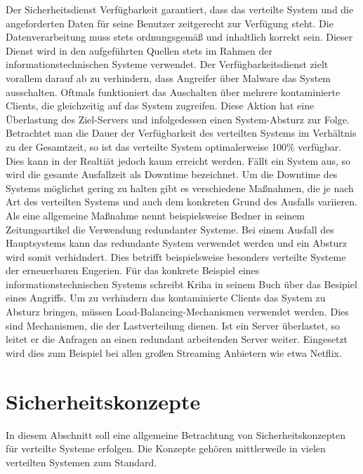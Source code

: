 \documentclass[utf8,biblatex]{lni}
\begin{document}
Der Sicherheitsdienst Verfügbarkeit garantiert, dass das verteilte System und die angeforderten Daten für seine Benutzer zeitgerecht zur Verfügung steht. Die Datenverarbeitung muss stets ordnungsgemäß
und inhaltlich korrekt sein. \citet{Bedner.2010}
Dieser Dienst wird in den aufgeführten Quellen stets im Rahmen der informationstechnischen Systeme verwendet. Der Verfügbarkeitsdienst
  zielt vorallem darauf ab zu verhindern, 
dass Angreifer über Malware das System ausschalten. Oftmals funktioniert das Auschalten über mehrere kontaminierte Clients, die gleichzeitig auf das System zugreifen. 
Diese Aktion hat eine Überlastung des Ziel-Servers und infolgedessen einen System-Absturz zur Folge. \citet{Kriha.2008}
\newline
Betrachtet man die Dauer der Verfügbarkeit des verteilten Systems im Verhältnis zu der Gesamtzeit, so ist das verteilte System optimalerweise 100\% verfügbar. Dies kann in der Realtiät jedoch kaum erreicht werden.
Fällt ein System aus, so wird die gesamte Ausfallzeit als Downtime bezeichnet. \citet{Bedner.2010}
\newline
 Um die Downtime des Systems möglichst gering zu halten gibt es verschiedene Maßnahmen, die je nach Art des verteilten Systems und auch
dem konkreten Grund des Ausfalls variieren. Als eine allgemeine Maßnahme nennt beispielsweise Bedner in seinem Zeitungsartikel \citet{Bedner.2010} die Verwendung redundanter Systeme. Bei einem Ausfall
des Hauptsystems kann das redundante System verwendet werden und ein Absturz wird somit verhidndert. Dies betrifft beispielsweise besonders verteilte Systeme der erneuerbaren Engerien.
Für das konkrete Beispiel eines informationstechnischen Systems schreibt Kriha in seinem Buch \citet{Kriha.2008} über das Besipiel eines Angriffs. Um zu verhindern das kontaminierte Clients das System zu Absturz
bringen, müssen Load-Balancing-Mechanismen verwendet werden. Dies sind Mechanismen, die der Lastverteilung dienen. Ist ein Server überlastet, so leitet er die Anfragen an einen redundant arbeitenden Server weiter.
Eingesetzt wird dies zum Beispiel bei allen großen Streaming Anbietern wie etwa Netflix.


\section{Sicherheitskonzepte}

In diesem Abschnitt soll eine allgemeine Betrachtung von Sicherheitskonzepten für verteilte Systeme erfolgen. 
Die Konzepte gehören mittlerweile in vielen verteilten Systemen zum Standard. 
\end{document}
